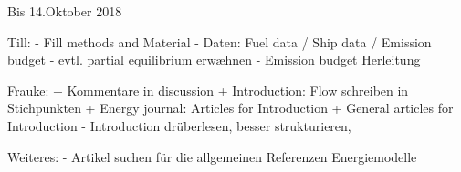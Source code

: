 Bis 14.Oktober 2018

Till:
- Fill methods and Material
- Daten: Fuel data / Ship data / Emission budget
- evtl. partial equilibrium erwæhnen
- Emission budget Herleitung

Frauke:
+ Kommentare in discussion
+ Introduction: Flow schreiben in Stichpunkten
+ Energy journal: Articles for Introduction
+ General articles for Introduction
- Introduction drüberlesen, besser strukturieren, 


Weiteres:
- Artikel suchen für die allgemeinen Referenzen Energiemodelle
